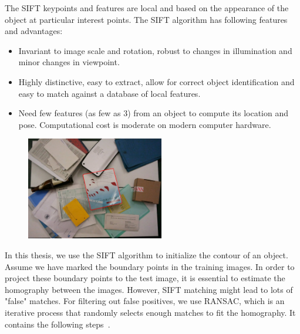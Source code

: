 \documentclass[conference]{IEEEtran}
\begin{document}
The SIFT keypoints and features are local and based on the appearance
of the object at particular interest points. The SIFT algorithm has following
features and advantages:
\begin{itemize}
\item Invariant to image scale and rotation, robust to changes in
  illumination and minor changes in viewpoint.
\item Highly distinctive, easy to extract, allow for correct object
  identification and easy to match against a database of local
  features. 
\item Need few features (as few as 3) from an object to compute its location
  and pose. Computational cost is moderate on modern computer hardware.
\end{itemize}


\begin{figure}[htbp]
  \centering
  \includegraphics[width=6cm]{experiments/book_sift/4.png}
\end{figure}

In this thesis, we use the SIFT algorithm to initialize the
contour of an object. Assume we have marked the boundary points in the
training images. In order to project these boundary points to the test
image, it is essential to estimate the homography between the
images. However, SIFT matching
might lead to lots of "false" matches. %
For filtering out false positives, we use RANSAC, which is an
iterative process that randomly selects enough matches to fit the
homography. It contains the following steps~\cite{fischler1981random}.
\end{document}
